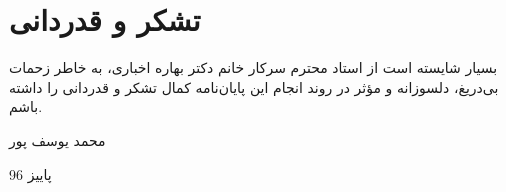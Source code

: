 \pagestyle{empty}
\section*{\Nastaliq
تشکر و قدردانی \\
}
بسيار شايسته است از استاد محترم سرکار خانم دکتر بهاره اخباری، به خاطر زحمات بی‌دریغ، دلسوزانه و مؤثر در روند انجام اين پايان‌نامه کمال تشکر و قدردانی را داشته باشم.  
\begin{flushleft}
\Nastaliq
محمد یوسف پور

پاییز 96 
\end{flushleft}
\restoregeometry

\newpage\null\newpage
\normalsize
